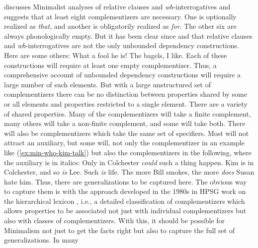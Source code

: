 \documentclass[output=paper
 	        ,biblatex
                ,babelshorthands
                ,newtxmath
                ,draftmode
                ,colorlinks, citecolor=brown
]{langscibook}
\begin{document}
\citet{Borsley2006a,Borsley2017a} discusses Minimalist analyses of relative clauses and \emph{wh}-interrogatives and suggests that at least eight complementizers are necessary. One is optionally realized as \emph{that}, and another is obligatorily realized as \emph{for}. The other six are always phonologically empty. But it has been clear since \citet{Ross67} and \citet{Chomsky77a-u} that relative clauses and \emph{wh}-interrogatives are not the only unbounded dependency constructions. Here are some others:
\eal
\settowidth{}
\ex What a fool he is!                          
\ex The bagels, I like.	                        
\zl 
Each of these constructions will require at least one empty complementizer. Thus, a comprehensive
account of unbounded dependency constructions will require a large number of such elements. 
But with a large unstructured set of complementizers there can be no distinction between properties
shared by some or all elements and properties restricted to a single element. There are a variety of shared properties. Many of the
complementizers will take a finite complement, many others will take a non-finite complement, and
some will take both. There will also be complementizers which take the same set of specifiers. Most
will not attract an auxiliary, but some will, not only the complementizer in an example like
(\ref{ex:min-who-kim-talk}) but also the complementizers in the following, where the auxiliary is in
italics: 
\eal
\ex Only in Colchester \emph{could} such a thing happen.
\ex Kim is in Colchester, and so \emph{is} Lee.
\ex Such \emph{is} life.
\ex The more Bill smokes, the more \emph{does} Susan hate him.
\zl
Thus, there are generalizations to be captured here. The obvious way to capture them is with the
approach developed in the 1980s in HPSG work on the hierarchical lexicon \citep*{FPW85a,Flickinger87}, i.e., a detailed
classification of complementizers which allows properties to be associated not just with individual
complementizers but also with classes of complementizers. With this, it should be possible for
Minimalism not just to get the facts right but also to capture the full set of generalizations. In many
\end{document}
